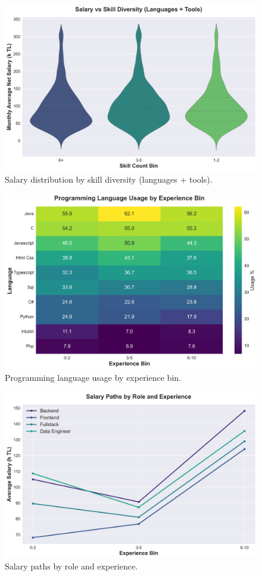 \begin{figure}[H]
  \centering
  \includegraphics[width=0.85\linewidth]{figures/22_skill_diversity_salary.png}
  \caption{Salary distribution by skill diversity (languages + tools).}
  \label{fig:skill-diversity}
\end{figure}

\begin{figure}[H]
  \centering
  \includegraphics[width=0.85\linewidth]{figures/23_experience_lang_usage_heatmap.png}
  \caption{Programming language usage by experience bin.}
  \label{fig:exp-usage}
\end{figure}

\begin{figure}[H]
  \centering
  \includegraphics[width=0.85\linewidth]{figures/24_role_experience_salary_paths.png}
  \caption{Salary paths by role and experience.}
  \label{fig:role-exp-salary}
\end{figure}

